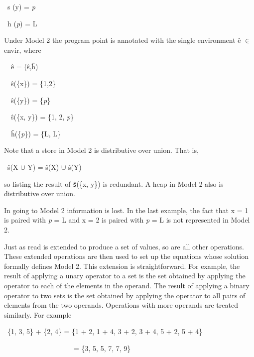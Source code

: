 {\ttfamily\mdseries
\ s (y) = \textit{p}\textit{}}

{\ttfamily\mdseries
\ h (\textit{p}\textit{}) = L}

Under Model 2 the program point is annotated with the single
environment \^e ${\in}$ envir\TextSubscript{[2]}, where

{\ttfamily\mdseries
\ \ \^e = (\^s,\^h)}

{\ttfamily\mdseries
\ \ \^s(\{x\}) = \{1,2\}}

{\ttfamily\mdseries
\ \ \^s(\{y\}) = \{\textit{p}\textit{}\}}

{\ttfamily\mdseries
\ \ \^s(\{x, y\}) = \{1, 2, \textit{p}\textit{}\}}

{\ttfamily\mdseries
\ \ \^h(\{\textit{p}\textit{}\}) = \{L, L\}}


Note that a store in Model 2 is distributive over union. That is, 

{\ttfamily\mdseries
\ \^s(X \textrm{${\cup}$} Y) = \^s(X) \textrm{${\cup}$} \^s(Y)}

\noindent so listing the result of \texttt{\^s}(\{x, y\}) is
redundant. A heap in Model 2 also is distributive over union.

In going to Model 2 information is lost. In the last example, the fact
that x = 1 is paired with \textit{p}\textit{} =
L and x = 2 is paired with
\textit{p}\textit{} = L is not
represented in Model 2.

Just as read is extended to produce a set of values, so are all other
operations. These {\textquotedbl}extended{\textquotedbl} operations
are then used to set up the equations whose solution formally defines
Model 2. This extension is straightforward. For example, the result of
applying a unary operator to a set is the set obtained by applying the
operator to each of the elements in the operand. The result of
applying a binary operator to two sets is the set obtained by applying
the operator to all pairs of elements from the two
operands. Operations with more operands are treated similarly. For
example

{\ttfamily\mdseries
\ \{1, 3, 5\} + \{2, 4\} = \{1 + 2, 1 + 4, 3 + 2, 3 + 4, 5 + 2, 5 + 4\}}

{\ttfamily\mdseries
\ \ \ \ \ \ \ \ \ \ \ \ \ \ \ \ \ \ \ \ = \{3, 5, 5, 7, 7, 9\}}

